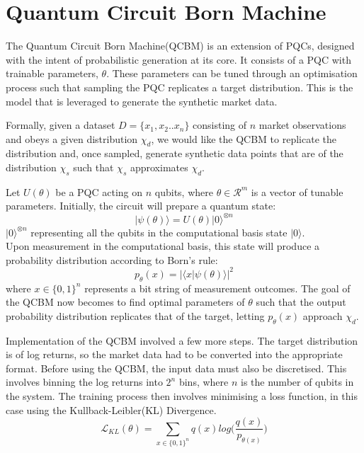\documentclass[12pt]{article}
\newcommand{\newp}
    {
    \vskip 0.5cm 
  }
\numberwithin{equation}{section}
\begin{document}
\clearpage
\section{Quantum Circuit Born Machine}
The Quantum Circuit Born Machine(QCBM) is an extension of PQCs, designed with the 
intent of probabilistic generation at its core. It consists of a PQC with trainable 
parameters, $\theta$. These parameters can be tuned through an optimisation process 
such that sampling the PQC replicates a target distribution. This is the model that 
is leveraged to generate the synthetic market data.
\newp
Formally, given a dataset $D = \{x_1, x_2.. x_n\}$ consisting of $n$ market observations and 
obeys a given distribution $\chi_d$, we would like the QCBM to replicate the distribution 
and, once sampled, generate synthetic data points that are of the distribution $\chi_s$ 
such that $\chi_s$ approximates $\chi_d$.
\newp
Let $U(\theta)$ be a PQC acting on $n$ qubits, where $\theta \in \mathcal{R}^m$ 
is a vector of tunable parameters. Initially, the circuit will prepare a quantum 
state:
\begin{equation}
|\psi(\theta)\rangle = U(\theta)|0\rangle^{\otimes n}
\end{equation}
$|0\rangle^{\otimes n}$ representing all the qubits in the computational basis
state $|0\rangle$.\\
Upon measurement in the computational basis, this state will produce a probability 
distribution according to Born's rule: 
\begin{equation}
p_{\theta}(x) = |\langle x|\psi(\theta)\rangle|^2
\end{equation}
where $x\in\{0,1\}^n$ represents a bit string of measurement outcomes. The goal 
of the QCBM now becomes to find optimal parameters of $\theta$ such that the 
output probability distribution replicates that of the target, letting $p_{\theta}
(x)$ approach $\chi_d$.
\newp
Implementation of the QCBM involved a few more steps. The target distribution 
is of log returns, so the market data had to be converted into the appropriate 
format. Before using the QCBM, the input data must also be discretised. This 
involves binning the log returns into $2^n$ bins, where $n$ is the number of 
qubits in the system. 
The training process then involves minimising a loss function, in this case using 
the Kullback-Leibler(KL) Divergence. 
\begin{equation}
\mathcal{L}_{KL}(\theta) = \sum_{x \in \{0,1\}^n}q(x)log\bigl( \frac{q(x)}{p_{\theta(x)}}\bigr)
\end{equation}
\end{document}
